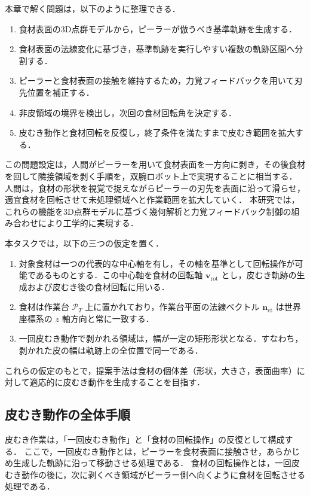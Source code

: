本章で解く問題は，以下のように整理できる．

\begin{enumerate}
  \item 食材表面の3D点群モデルから，ピーラーが倣うべき基準軌跡を生成する．
  \item 食材表面の法線変化に基づき，基準軌跡を実行しやすい複数の軌跡区間へ分割する．
  \item ピーラーと食材表面の接触を維持するため，力覚フィードバックを用いて刃先位置を補正する．
  \item 非皮領域の境界を検出し，次回の食材回転角を決定する．
  \item 皮むき動作と食材回転を反復し，終了条件を満たすまで皮むき範囲を拡大する．
\end{enumerate}

この問題設定は，人間がピーラーを用いて食材表面を一方向に剥き，その後食材を回して隣接領域を剥く手順を，双腕ロボット上で実現することに相当する．
人間は，食材の形状を視覚で捉えながらピーラーの刃先を表面に沿って滑らせ，適宜食材を回転させて未処理領域へと作業範囲を拡大していく．
本研究では，これらの機能を3D点群モデルに基づく幾何解析と力覚フィードバック制御の組み合わせにより工学的に実現する．

本タスクでは，以下の三つの仮定を置く．

\begin{enumerate}
  \item 対象食材は一つの代表的な中心軸を有し，その軸を基準として回転操作が可能であるものとする．この中心軸を食材の回転軸 $\mathbf{v}_{\mathrm{rot}}$ とし，皮むき軌跡の生成および皮むき後の食材回転に用いる．
  \item 食材は作業台 $\mathcal{P}_T$ 上に置かれており，作業台平面の法線ベクトル $\mathbf{n}_{\mathrm{ct}}$ は世界座標系の $z$ 軸方向と常に一致する．
  \item 一回皮むき動作で剥かれる領域は，幅が一定の矩形形状となる．すなわち，剥かれた皮の幅は軌跡上の全位置で同一である．
\end{enumerate}

これらの仮定のもとで，提案手法は食材の個体差（形状，大きさ，表面曲率）に対して適応的に皮むき動作を生成することを目指す．

\subsection{皮むき動作の全体手順}

皮むき作業は，「一回皮むき動作」と「食材の回転操作」の反復として構成する．
ここで，一回皮むき動作とは，ピーラーを食材表面に接触させ，あらかじめ生成した軌跡に沿って移動させる処理である．
食材の回転操作とは，一回皮むき動作の後に，次に剥くべき領域がピーラー側へ向くように食材を回転させる処理である．

